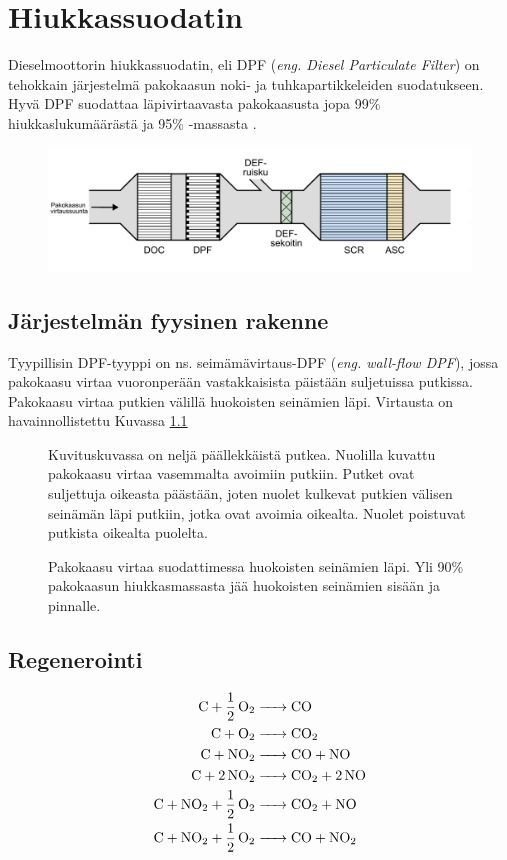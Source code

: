 \chapter{Hiukkassuodatin}%
\label{ch:dpf}


Dieselmoottorin hiukkassuodatin, eli DPF (\emph{eng. Diesel Particulate Filter}) on tehokkain järjestelmä pakokaasun noki- ja tuhkapartikkeleiden suodatukseen. 
Hyvä DPF suodattaa läpivirtaavasta pakokaasusta jopa 99\% hiukkaslukumäärästä ja 95\% -massasta \cite{Yan_state_of_the_art}. 

\begin{figure}[H]
    \centering
    \includegraphics[width=\textwidth]{figures/EAT.pdf}
\end{figure}

\section{Järjestelmän fyysinen rakenne}

Tyypillisin DPF-tyyppi on ns. seimämävirtaus-DPF (\emph{eng. wall-flow DPF}), jossa pakokaasu virtaa vuoronperään vastakkaisista päistään suljetuissa putkissa. Pakokaasu virtaa putkien välillä huokoisten seinämien läpi. Virtausta on havainnollistettu Kuvassa \ref{fig:wall-flow-dpf}  


\begin{figure}[H]
    \centering 
    
    \pdftooltip{}
                {Kuvituskuvassa on neljä päällekkäistä putkea. Nuolilla kuvattu pakokaasu virtaa vasemmalta avoimiin putkiin. Putket ovat suljettuja oikeasta päästään, joten nuolet kulkevat putkien välisen seinämän läpi putkiin, jotka ovat avoimia oikealta. Nuolet poistuvat putkista oikealta puolelta.
                }
    \caption{Pakokaasu virtaa suodattimessa huokoisten seinämien läpi. Yli 90\% pakokaasun hiukkasmassasta jää huokoisten seinämien sisään ja pinnalle.}
    \label{fig:wall-flow-dpf}
\end{figure}



\section{Regenerointi}
\begin{align*}
    \ce{C + 1/2 O2 &-> CO }\\
    \ce{C + O2 &-> CO2}\\
    \ce{C + NO2 &-> CO +  NO}  \\
    \ce{C + 2 NO2 &-> CO2 + 2 NO}  \\
    \ce{C + NO2 + 1/2 O2 &-> CO2 + NO}  \\
    \ce{C + NO2 + 1/2 O2 &-> CO + NO2} 
\end{align*}


